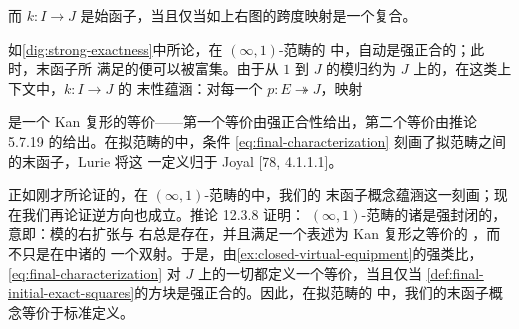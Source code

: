 \begin{definition}
\begin{center}
\end{center}
而 $k\colon I\to J$ 是始函子，当且仅当如上右图的跨度映射是一个复合。
\end{definition}

\begin{remark}\label{rem:strongly-exact-finality}
如\cref{dig:strong-exactness}中所论，在 $(\infty,1)$-范畴的%
\trInfinityCosmos{}中，\trExactSquare{}自动是强正合的；此时，末函子所
满足的\trUniversalProperty{}便可以被富集。由于从 $1$ 到 $J$ 的模归约为
$J$ 上的\trDiscreteCartesianFibration，在这类上下文中，$k\colon I\to J$ 的
末性蕴涵：对每一个\trDiscreteCartesianFibration{}
$p\colon E\twoheadrightarrow J$，映射
\begin{rveq}\label{eq:final-characterization}
\end{rveq}
是一个 Kan 复形的等价——第一个等价由强正合性给出，第二个等价由推论
5.7.19 的\trYonedaLemma{}给出。在拟范畴的\trInfinityCosmos{}中，条件
\eqref{eq:final-characterization} 刻画了拟范畴之间的末函子，Lurie 将这
一定义归于 Joyal [78, 4.1.1.1]。
\end{remark}

正如刚才所论证的，在 $(\infty,1)$-范畴的\trInfinityCosmos{}中，我们的
末函子概念蕴涵这一刻画；现在我们再论证逆方向也成立。推论 12.3.8 证明：
$(\infty,1)$-范畴的诸\trInfinityCosmos{}是强封闭的，意即：模的右扩张与
右\trLifting{}总是存在，并且满足一个表述为 Kan 复形之等价的%
\trUniversalProperty{}，而不只是在\trVirtualEquipment{}中诸\trCell{}的
一个双射。于是，由\cref{ex:closed-virtual-equipment}的强类比，
\eqref{eq:final-characterization}
对 $J$ 上的一切\trDiscreteCartesianFibration{}都定义一个等价，当且仅当%
\cref{def:final-initial-exact-squares}的方块是强正合的。因此，在拟范畴的%
\trInfinityCosmos{}中，我们的末函子概念等价于标准定义。

